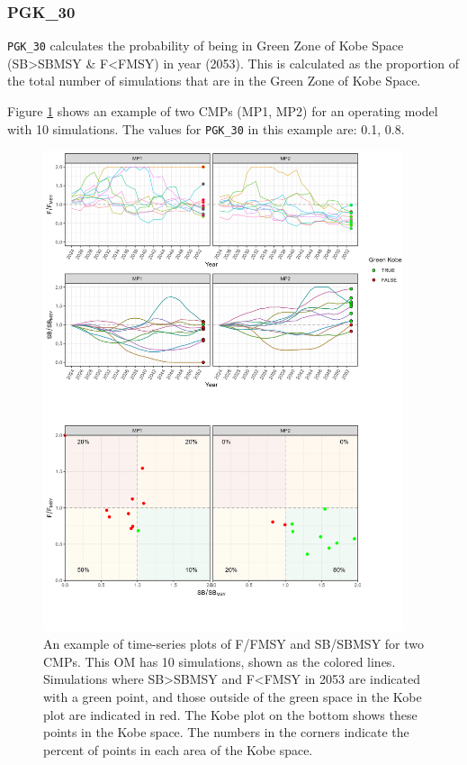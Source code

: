 \documentclass[
]{article}
\begin{document}
\hypertarget{pgk_30}{%
\subsubsection{PGK\_30}\label{pgk_30}}

\texttt{PGK\_30} calculates the probability of being in Green Zone of Kobe Space (SB\textgreater SBMSY \& F\textless FMSY) in year (2053). This is calculated as the proportion of the total number of simulations that are in the Green Zone of Kobe Space.

Figure \ref{fig:PGK30} shows an example of two CMPs (MP1, MP2) for an operating model with 10 simulations. The values for \texttt{PGK\_30} in this example are: 0.1, 0.8.

\begin{figure}
\includegraphics[width=400px]{../../img/PMs/PGK_30} \caption{An example of time-series plots of F/FMSY and SB/SBMSY for two CMPs. This OM has 10 simulations, shown as the colored lines. Simulations where SB>SBMSY and F<FMSY in 2053 are indicated with a green point, and those outside of the green space in the Kobe plot are indicated in red. The Kobe plot on the bottom shows these points in the Kobe space. The numbers in the corners indicate the percent of points in each area of the Kobe space.}\label{fig:PGK30}
\end{figure}
\end{document}
